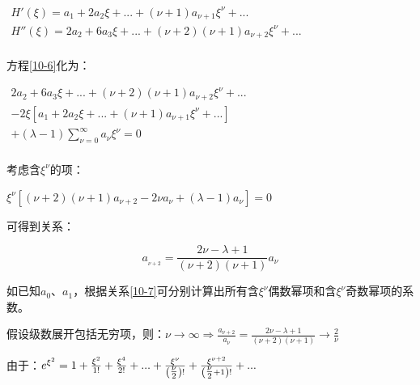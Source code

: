 \begin{center}
$\begin{array}{l}
 H'\left( \xi  \right) = a_1  + 2a_2 \xi  + ... + \left( {\nu  + 1} \right)a_{\nu  + 1} \xi ^\nu   + ... \\
 H''\left( \xi  \right) = 2a_2  + 6a_3 \xi  + ... + \left( {\nu  + 2} \right)\left( {\nu  + 1} \right)a_{\nu  + 2} \xi ^\nu   + ... \\
 \end{array}$
\end{center}

方程\ref{10-6}化为：

\begin{center}
$\begin{array}{l}
 2a_2  + 6a_3 \xi  + ... + \left( {\nu  + 2} \right)\left( {\nu  + 1} \right)a_{\nu  + 2} \xi ^\nu   + ... \\
  - 2\xi \left[ {a_1  + 2a_2 \xi  + ... + \left( {\nu  + 1} \right)a_{\nu  + 1} \xi ^\nu   + ...} \right] \\
  + \left( {\lambda  - 1} \right)\sum\limits_{\nu  = 0}^\infty  {a_\nu  \xi ^\nu  }  = 0 \\
 \end{array}$
\end{center}

考虑含$\xi ^\nu$的项：

\begin{center}
$\xi ^\nu  \left[ {\left( {\nu  + 2} \right)\left( {\nu  + 1} \right)a_{\nu  + 2}  - 2\nu a_\nu   + \left( {\lambda  - 1} \right)a_\nu  } \right] = 0$
\end{center}

可得到关系：

\begin{equation}\label{10-7}
a_{_{\nu  + 2} }  = \frac{{2\nu  - \lambda  + 1}}{{\left( {\nu  + 2} \right)\left( {\nu  + 1} \right)}}a_\nu
\end{equation}


如已知$a_0$、$a_1$，根据关系\ref{10-7}可分别计算出所有含$\xi ^\nu$偶数幂项和含$\xi ^\nu$奇数幂项的系数。



假设级数展开包括无穷项，则：$\nu  \to \infty  \Rightarrow \frac{{a_{\nu  + 2} }}{{a_\nu  }} = \frac{{2\nu  - \lambda  + 1}}{{\left( {\nu  + 2} \right)\left( {\nu  + 1} \right)}} \to \frac{2}{\nu }$

由于：$e^{\xi ^2 }  = 1 + \frac{{\xi ^2 }}{{1!}} + \frac{{\xi ^4 }}{{2!}} + ... + \frac{{\xi ^\nu  }}{{\left( {{\textstyle{\nu  \over 2}}} \right)!}} + \frac{{\xi ^{\nu  + 2} }}{{\left( {{\textstyle{\nu  \over 2}} + 1} \right)!}} + ...$

